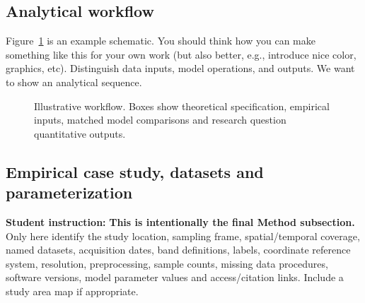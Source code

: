 \documentclass[11pt,letterpaper]{article}
\newcommand{\guide}[1]{\par\begingroup\color{blue!60!black}\small\textbf{Student
instruction:} #1\par\endgroup}
\begin{document}
\subsection{Analytical workflow}
Figure~\ref{fig:workflow} is an example schematic. You should think how you can make something 
like this for your own work (but also better, e.g., introduce nice color, graphics, etc). 
Distinguish data inputs, model operations, and outputs. We want to show an analytical sequence.
\begin{figure}[htbp]\centering
{}
\caption{Illustrative workflow. Boxes show theoretical specification,
empirical inputs, matched model comparisons and research question quantitative
outputs.}\label{fig:workflow}
\end{figure}
\subsection{Empirical case study, datasets and parameterization}
\guide{\textbf{This is intentionally the final Method subsection.} Only here identify the
study location, sampling frame, spatial/temporal coverage, named datasets, acquisition
dates, band definitions, labels, coordinate reference system, resolution, preprocessing,
sample counts, missing data procedures, software versions, model parameter values and
access/citation links. Include a study area map if appropriate.}
\end{document}
